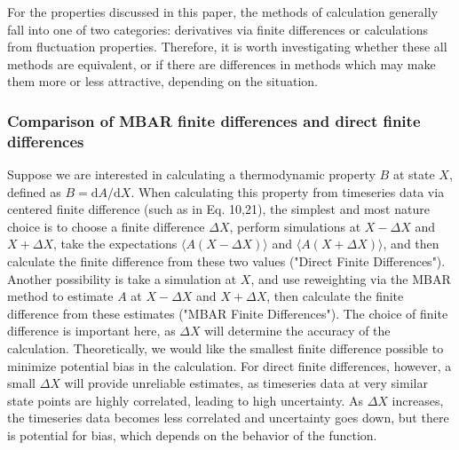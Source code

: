 \documentclass[9pt,bestpractices]{livecoms}
\begin{document}
For the properties discussed in this paper, the methods of calculation generally fall into one of two categories: derivatives via finite differences or calculations from fluctuation properties. Therefore, it is worth investigating whether these all methods are equivalent, or if there are differences in methods which may make them more or less attractive, depending on the situation.  

\subsubsection{Comparison of MBAR finite differences and direct finite differences}
Suppose we are interested in calculating a thermodynamic property $B$ at state $X$, defined as $B=\mathrm{d}A/\mathrm{d}X$.
When calculating this property from timeseries data via centered finite difference (such as in Eq. 10,21), the simplest and most nature choice is to choose a finite difference $\Delta X$, perform simulations at $X-\Delta X$ and $X+\Delta X$, take the expectations $\langle A(X-\Delta X) \rangle$ and $\langle A(X+\Delta X)\rangle $, and then calculate the finite difference from these two values ("Direct Finite Differences").
  Another possibility is take a simulation at $X$, and use reweighting via the MBAR method \cite{MBAR} to estimate $A$ at $X-\Delta X$ and $X+\Delta X$, then calculate the finite difference from these estimates ("MBAR Finite Differences").  
The choice of finite difference is important here, as $\Delta X$ will determine the accuracy of the calculation. Theoretically, we would like the smallest finite difference possible to minimize potential bias in the calculation.  For direct finite differences, however, a small $\Delta X $ will provide unreliable estimates, as timeseries data at very similar state points are highly correlated, leading to high uncertainty.  As $ \Delta X $ increases, the timeseries data becomes less correlated and uncertainty goes down, but there is potential for bias, which depends on the behavior of the function.
\end{document}
